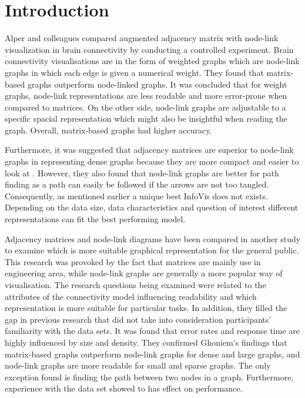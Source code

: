 \documentclass{l4proj}
\begin{document}
\chapter{Introduction}

Alper and colleagues \cite{alper2013weighted} compared augmented adjacency matrix with node-link visualization in brain connectivity by conducting a controlled experiment. Brain connectivity visualisations are in the form of weighted graphs which are node-link graphs in which each edge is given a numerical weight. They found that matrix-based graphs outperform node-linked graphs. It was concluded that for weight graphs, node-link representations are less readable and more error-prone when compared to matrices. On the other side, node-link graphs are adjustable to a specific spacial representation which might also be insightful when reading the graph. Overall, matrix-based graphs had higher accuracy.  

Furthermore, it was suggested that adjacency matrices are superior to node-link graphs in representing dense graphs because they are more compact and easier to look at \cite{sheny2007path}. However, they also found that node-link graphs are better for path finding as a path can easily be followed if the arrows are not too tangled. Consequently, as mentioned earlier a unique best InfoVis does not exists. Depending on the data size, data characteristics and question of interest different representations can fit the best performing model. 


Adjacency matrices and node-link diagrams have been compared in another study \cite{keller2006matrices} to examine which is more suitable graphical representation for the general public. This research was provoked by the fact that matrices are mainly use in engineering area, while node-link graphs are generally a more popular way of visualisation. The research questions being examined were related to the attributes of the connectivity model influencing readability and which representation is more suitable for particular tasks. In addition, they filled the gap in previous research that did not take into consideration participants' familiarity with the data sets. It was found that error rates and response time are highly influenced by size and density. They confirmed Ghoniem's \cite{ghoniem2004comparison} findings that matrix-based graphs outperform node-link graphs for dense and large graphs, and node-link graphs are more readable for small and sparse graphs. The only exception found is finding the path between two nodes in a graph. Furthermore, experience with the data set showed to has effect on performance. 
\end{document}
